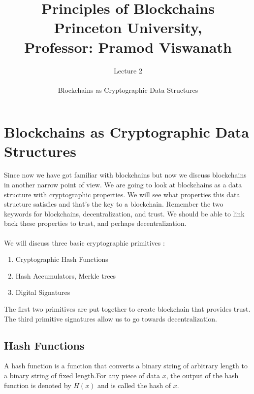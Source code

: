 \documentclass{report}
\title{\Huge{Principles of Blockchains \\ Princeton University,\\
		Professor: Pramod Viswanath}}
\author{\huge{Lecture 2} \\\\ Blockchains as Cryptographic Data Structures}
\begin{document}
\maketitle
\newpage%
\tableofcontents
\pagebreak

\chapter{Blockchains as Cryptographic Data Structures}
Since now we have got familiar with blockchains but now we discuss blockchains in another narrow point of view. We are going to look at blockchains as a data structure with cryptographic properties. We will see what properties this data structure satisfies and that's the key to a blockchain. Remember the two keywords for blockchains, decentralization, and trust.  We should be able to link back these properties to trust, and perhaps decentralization.\\\\
We will discuss three basic cryptographic primitives :
\begin{enumerate}
	\item Cryptographic Hash Functions
	\item Hash Accumulators, Merkle trees
	\item Digital Signatures
\end{enumerate}
The first two primitives are put together to create blockchain that provides trust. The third primitive signatures allow us to go towards decentralization.
\section{Hash Functions}
A hash function is a function that converts a binary string of arbitrary length to a binary string of fixed length.For any piece of data $x$, the output of the hash function is denoted by $H(x)$ and is called the hash of $x$. 
\end{document}
